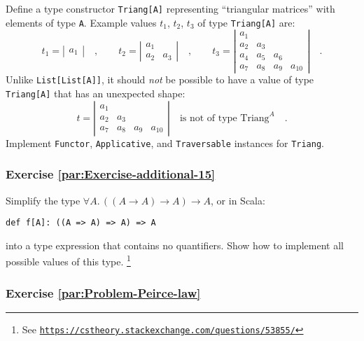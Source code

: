 Define a type constructor \lstinline!Triang[A]! representing \textsf{``}triangular
matrices\textsf{''} with elements of type \lstinline!A!. Example values $t_{1}$,
$t_{2}$, $t_{3}$ of type \lstinline!Triang[A]! are:
\[
t_{1}=\left|\begin{array}{c}
a_{1}\end{array}\right|\quad,\quad\quad t_{2}=\left|\begin{array}{cc}
a_{1}\\
a_{2} & a_{3}
\end{array}\right|\quad,\quad\quad t_{3}=\left|\begin{array}{cccc}
a_{1}\\
a_{2} & a_{3}\\
a_{4} & a_{5} & a_{6}\\
a_{7} & a_{8} & a_{9} & a_{10}
\end{array}\right|\quad.
\]
Unlike \lstinline!List[List[A]]!, it should \emph{not} be possible
to have a value of type \lstinline!Triang[A]! that has an unexpected
shape:
\[
t=\left|\begin{array}{cccc}
a_{1}\\
a_{2} & a_{3}\\
a_{7} & a_{8} & a_{9} & a_{10}
\end{array}\right|\quad\text{is not of type }\text{Triang}^{A}\quad.
\]
 Implement \lstinline!Functor!, \lstinline!Applicative!, and \lstinline!Traversable!
instances for \lstinline!Triang!.

\subsubsection{Exercise \label{par:Exercise-additional-15}\ref{par:Exercise-additional-15}}

Simplify the type $\forall A.\,((A\rightarrow A)\rightarrow A)\rightarrow A$,
or in Scala:
\begin{lstlisting}
def f[A]: ((A => A) => A) => A
\end{lstlisting}
into a type expression that contains no quantifiers. Show how to implement
all possible values of this type. \footnote{See \texttt{\href{https://cstheory.stackexchange.com/questions/53855/}{https://cstheory.stackexchange.com/questions/53855/}}}

\subsubsection{Exercise \label{par:Problem-Peirce-law}\ref{par:Problem-Peirce-law}}

